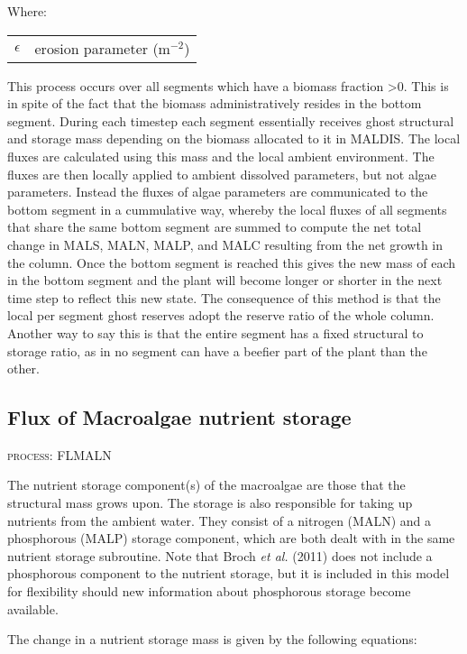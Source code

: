 \documentclass{deltares_manual}
\begin{document}
Where:\\
\begin{tabular}{ll}
$\epsilon$ & erosion parameter (m$^{-2}$)\\
\end{tabular}

This process occurs over all segments which have a biomass fraction \textgreater 0. This is in spite of the fact that the biomass administratively resides in the bottom segment. During each timestep each segment essentially receives ghost structural and storage mass depending on the biomass allocated to it in MALDIS. The local fluxes are calculated using this mass and the local ambient environment. The fluxes are then locally applied to ambient dissolved parameters, but not algae parameters. Instead the fluxes of algae parameters are communicated to the bottom segment in a cummulative way, whereby the local fluxes of all segments that share the same bottom segment are summed to compute the net total change in MALS, MALN, MALP, and MALC resulting from the net growth in the column. Once the bottom segment is reached this gives the new mass of each in the bottom segment and the plant will  become longer or shorter in the next time step to reflect this new state. The consequence of this method is that the local per segment ghost reserves adopt the reserve ratio of the whole column. Another way to say this is that the entire segment has a fixed structural to storage ratio, as in no segment can have a beefier part of the plant than the other.

\subsection{Flux of Macroalgae nutrient storage}
\begin{flushright}
\textsc{process: FLMALN}
\end{flushright}

The nutrient storage component(s) of the macroalgae are those that the structural mass grows upon. The storage is also responsible for taking up nutrients from the ambient water. They consist of a nitrogen (MALN) and a phosphorous (MALP) storage component, which are both dealt with in the same nutrient storage subroutine. Note that Broch \textit{et al.} (2011) does not include a phosphorous component to the nutrient storage, but it is included in this model for flexibility should new information about phosphorous storage become available.

The change in a nutrient storage mass is given by the following equations:
\end{document}
